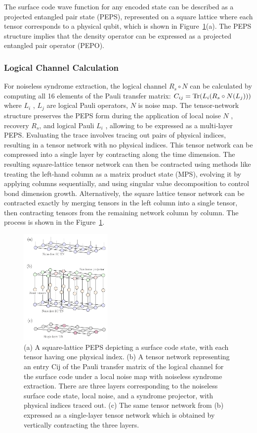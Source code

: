 The surface code wave function for any encoded state can be described as a projected entangled pair state (PEPS), represented on a square lattice where each tensor corresponds to a physical qubit, which is shown in Figure~\ref{fig:TN_layout}(a). The PEPS structure implies that the density operator can be expressed as a projected entangled pair operator (PEPO).
\subsubsection{Logical Channel Calculation}

For noiseless syndrome extraction, the logical channel $R_s \circ N$ can be calculated by computing all 16 elements of the Pauli transfer matrix: $C_{ij} = {\rm Tr}(L_i(R_s\circ N(L_j)))$
where $L_i$ , $L_j$ are logical Pauli operators, $N$ is noise map. The tensor-network structure preserves the PEPS form during the application of local noise $N$ , recovery  $R_s$, and logical Pauli $L_i$ , allowing  to be expressed as a multi-layer PEPS. Evaluating the trace involves tracing out pairs of physical indices, resulting in a tensor network with no physical indices. This tensor network can be compressed into a single layer by contracting along the time dimension. The resulting square-lattice tensor network can then be contracted using methods like treating the left-hand column as a matrix product state (MPS), evolving it by applying columns sequentially, and using singular value decomposition to control bond dimension growth. Alternatively, the square lattice tensor network can be contracted exactly by merging tensors in the left column into a single tensor, then contracting tensors from the remaining network column by column. The process is shown in the Figure~\ref{fig:TN_layout}.

\begin{figure}[h]
    \centering
    \includegraphics[width=0.4\textwidth]{sections/3_decoder/TN_layout.jpg}
    \caption{(a) A square-lattice PEPS depicting a surface code state, with each tensor having one physical index. (b) A tensor network representing an entry Cij of the Pauli transfer matrix of the logical channel for the surface code under a local noise map with noiseless syndrome extraction. There are three layers corresponding to the noiseless surface code state, local noise, and a syndrome projector, with physical indices traced out. (c) The same tensor network from (b) expressed as a single-layer tensor network which is obtained by vertically contracting the three layers.}
    \label{fig:TN_layout}
\end{figure}

